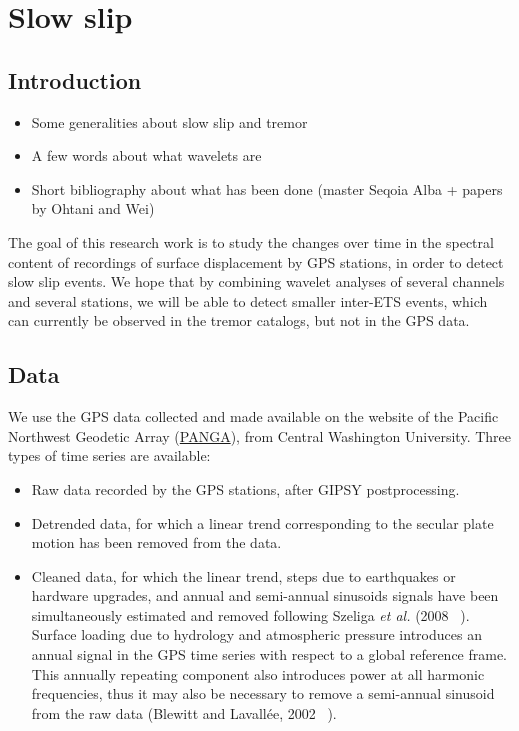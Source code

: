 \documentclass[main.tex]{subfiles}
\begin{document}
\part{Slow slip}

\chapter{Introduction}

\begin{itemize}
	\item Some generalities about slow slip and tremor
	\item A few words about what wavelets are
	\item Short bibliography about what has been done (master Seqoia Alba + papers by Ohtani and Wei)
\end{itemize}

The goal of this research work is to study the changes over time in the spectral content of recordings of surface displacement by GPS stations, in order to detect slow slip events. We hope that by combining wavelet analyses of several channels and several stations, we will be able to detect smaller inter-ETS events, which can currently be observed in the tremor catalogs, but not in the GPS data.

\chapter{Data}

We use the GPS data collected and made available on the website of the Pacific Northwest Geodetic Array (\href{http://www.geodesy.cwu.edu/}{PANGA}), from Central Washington University. Three types of time series are available:

\begin{itemize}
\item Raw data recorded by the GPS stations, after GIPSY postprocessing.
\item Detrended data, for which a linear trend corresponding to the secular plate motion has been removed from the data.
\item Cleaned data, for which the linear trend, steps due to earthquakes or hardware upgrades, and annual and semi-annual sinusoids signals have been simultaneously estimated and removed following Szeliga \textit{et al.} (2008 ~\cite{SZE_2008}). Surface loading due to hydrology and atmospheric pressure introduces an annual signal in the GPS time series with respect to a global reference frame. This annually repeating component also introduces power at all harmonic frequencies, thus it may also be necessary to remove a semi-annual sinusoid from the raw data (Blewitt and Lavall\'ee, 2002 ~\cite{BLE_2002}).
\end{itemize}
\end{document}
